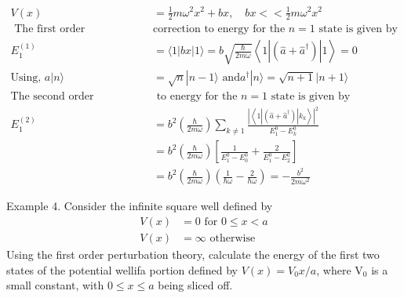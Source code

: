 \begin{answer}
	\begin{align*}
	V(x)&=\frac{1}{2} m \omega^{2} x^{2}+b x, \quad b x<<\frac{1}{2} m \omega^{2} x^{2}\\
\text{	The first order }&\text{correction to energy for the $n=1$ state is given by}\\
	E_{1}^{(1)}&=\langle 1|b x| 1\rangle=b \sqrt{\frac{\hbar}{2 m \omega}}\left\langle 1\left|\left(\hat{a}+\hat{a}^{\dagger}\right)\right| 1\right\rangle=0\\
	\text{Using, }a|n\rangle&=\sqrt{n}|n-1\rangle\text{ and} a^{\dagger}|n\rangle=\sqrt{n+1}|n+1\rangle\\
	\text{The second order correction}&\text{ to energy for the $n=1$ state is given by}\\
	E_{1}^{(2)} &=b^{2}\left(\frac{\hbar}{2 m \omega}\right) \sum_{k \neq 1} \frac{\left|\left\langle 1\left|\left(\hat{a}+\hat{a}^{\dagger}\right)\right| k_{k}\right\rangle\right|^{2}}{E_{1}^{0}-E_{k}^{0}}\\&=b^{2}\left(\frac{\hbar}{2 m \omega}\right)\left[\frac{1}{E_{1}^{0}-E_{0}^{0}}+\frac{2}{E_{1}^{0}-E_{2}^{0}}\right] \\
	&=b^{2}\left(\frac{\hbar}{2 m \omega}\right)\left(\frac{1}{\hbar \omega}-\frac{2}{\hbar \omega}\right)=-\frac{b^{2}}{2 m \omega^{2}}
	\end{align*}
\end{answer}
\begin{exercise}
	Example 4. Consider the infinite square well defined by
	$$
	\begin{aligned}
	V(x)&=0 \text { for } 0 \leq x<a \\
	V(x)&=\infty \text { otherwise }
	\end{aligned}
	$$
	Using the first order perturbation theory, calculate the energy of the first two states of the potential wellifa portion defined by $V(x)=V_{0} x / a$, where $\mathrm{V}_{0}$ is a small constant, with $0 \leq x \leq a$ being sliced off.
\end{exercise}
